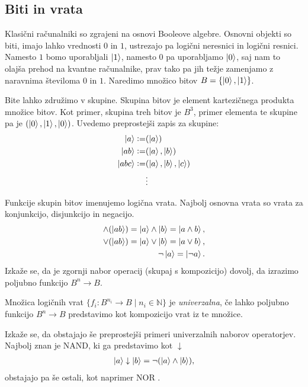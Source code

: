 \documentclass[mat1]{fmfdelo}
\newcommand{\N}{\mathbb N}
\newcommand{\defeq}{\vcentcolon=}
\begin{document}
\subsection{Biti in vrata}
Klasični računalniki so zgrajeni na osnovi Booleove algebre. Osnovni objekti so biti, imajo lahko vrednosti \(0\) in \(1\), ustrezajo pa logični neresnici in logični resnici. Namesto \(1\) bomo uporabljali \(\ket{1}\), namesto \(0\) pa uporabljamo \(\ket{0}\), saj nam to olajša prehod na kvantne računalnike, prav tako pa jih težje zamenjamo z naravnima številoma \(0\) in \(1\). Naredimo množico bitov \(B = \{\ket0, \ket1\}\).

Bite lahko združimo v skupine. Skupina bitov je element kartezičnega produkta množice bitov. Kot primer, skupina treh bitov je \(B^3\), primer elementa te skupine pa je \((\ket0, \ket1, \ket0)\). Uvedemo preprostejši zapis za skupine: 
\begin{align*}
    \ket{a} \defeq& (\ket a)\\
    \ket{ab} \defeq& (\ket{a},\ket b)\\
    \ket{abc} \defeq& (\ket a, \ket b, \ket c)\\
    &\vdots
\end{align*}

Funkcije skupin bitov imenujemo logična vrata. Najbolj osnovna vrata so vrata za konjunkcijo, disjunkcijo in negacijo.
\begin{align*}
    \land(\ket{ab}) = \ket{a}\land\ket{b} = \ket{a\land b},\\
    \lor(\ket{ab}) = \ket{a}\lor\ket{b} = \ket{a\lor b},\\
    \lnot\ket{a} = \ket{\lnot a}.
\end{align*}
Izkaže se, da je zgornji nabor operacij (skupaj s kompozicijo) dovolj, da izrazimo poljubno funkcijo \(B^n\to B\).
\begin{definicija}
    Množica logičnih vrat \(\{f_i: B^{n_i}\to B \mid n_i\in \N\}\) je \emph{univerzalna}, če lahko poljubno funkcijo \(B^n\to B\) predstavimo kot kompozicijo vrat iz te množice.
\end{definicija}
Izkaže se, da obstajajo še preprostejši primeri univerzalnih naborov operatorjev. Najbolj znan je \textsf{NAND}, ki ga predstavimo kot \(\downarrow\)
\begin{align*}
    \ket{a}\downarrow \ket{b} = \lnot (\ket{a} \land \ket{b}),
\end{align*}
obstajajo pa še ostali, kot naprimer \textsf{NOR} \cite{sheffers}.
\end{document}

